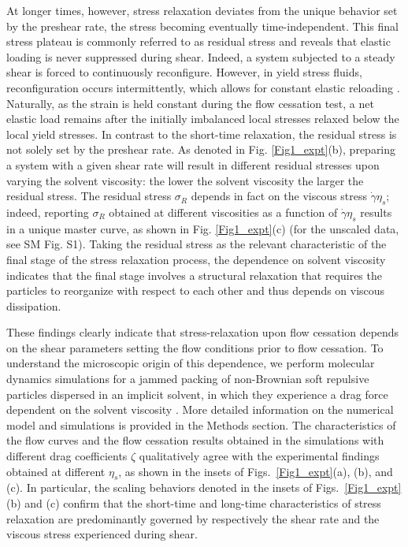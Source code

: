 \documentclass[%
preprint,
 amsmath,amssymb,
 aps,
]{revtex4-1}
\begin{document}
At longer times, however, stress relaxation deviates from the unique behavior set by the preshear rate, the stress becoming eventually time-independent. This final stress plateau is commonly referred to as residual stress \cite{ballauff2013residual,mohan2015build,vasisht2022residual} and reveals that elastic loading is never suppressed during shear. Indeed, a system subjected to a steady shear is forced to continuously reconfigure. However, in yield stress fluids, reconfiguration occurs intermittently, which allows for constant elastic reloading \cite{khabaz2020particle,vasisht2018rate,song2022microscopic,hwang2016understanding}. Naturally, as the strain is held constant during the flow cessation test, a net elastic load remains after the initially imbalanced local stresses relaxed below the local yield stresses. In contrast to the short-time relaxation, the residual stress is not solely set by the preshear rate. As denoted in Fig. \ref{Fig1_expt}(b), preparing a system with a given shear rate will result in different residual stresses upon varying the solvent viscosity: the lower the solvent viscosity the larger the residual stress. The residual stress ${\sigma}_R$ depends in fact on the viscous stress $\dot{\gamma} {\eta}_s$; indeed, reporting ${\sigma}_R$ obtained at different viscosities as a function of $\dot{\gamma} {\eta}_s$ results in a unique master curve,  as shown in Fig. \ref{Fig1_expt}(c)  (for the unscaled data, see SM Fig. S1). Taking the residual stress as the relevant characteristic of the final stage of the stress relaxation process, the dependence on solvent viscosity indicates that the final stage involves a structural relaxation that requires the particles to reorganize with respect to each other and thus depends on viscous dissipation. 


These findings clearly indicate that stress-relaxation upon flow cessation depends on the shear parameters setting the flow conditions prior to flow cessation. To understand the microscopic origin of this dependence, we perform molecular dynamics simulations for a jammed packing of non-Brownian soft repulsive particles dispersed in an implicit solvent, in which they experience a drag force dependent on the solvent viscosity \cite{vasisht2020computational,vasisht2020emergence}. More detailed information on the numerical model and simulations is provided in the Methods section. The characteristics of the flow curves and the flow cessation results obtained in the simulations with different drag coefficients $\zeta$ qualitatively agree with the experimental findings obtained at different $\eta_s$, as shown in the insets of Figs.~\ref{Fig1_expt}(a), (b), and (c). In particular, the scaling behaviors denoted in the insets of Figs.~\ref{Fig1_expt}(b) and (c) confirm that the short-time and long-time characteristics of stress relaxation are predominantly governed by respectively the shear rate and the viscous stress experienced during shear.  
\end{document}
